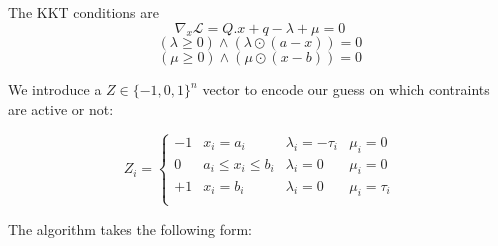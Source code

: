 \documentclass[A4]{article}
\begin{document}
The KKT conditions are
\begin{equation*}
  \nabla_x \mathcal{L} = Q.x+q-\lambda+\mu =0
\end{equation*}
\begin{equation*}
  (\lambda \ge 0)\wedge(\lambda\odot(a-x))=0 
\end{equation*}
\begin{equation*}
  (\mu \ge 0)\wedge(\mu\odot(x-b))=0
\end{equation*}

We introduce a $Z\in\{-1,0,1\}^n$ vector to encode our guess on which contraints are active or not:

\begin{equation*}
  Z_i = \left\{
    \begin{array}{c|c|cc}
      -1 & x_i=a_i & \lambda_i = -\tau_i &  \mu_i = 0 \\
      0  & a_i \le x_i \le b_i & \lambda_i = 0 & \mu_i = 0 \\
      +1 &  x_i=b_i & \lambda_i = 0 &  \mu_i = \tau_i \\
    \end{array}
  \right.
\end{equation*} 

The algorithm takes the following form:
\end{document}
